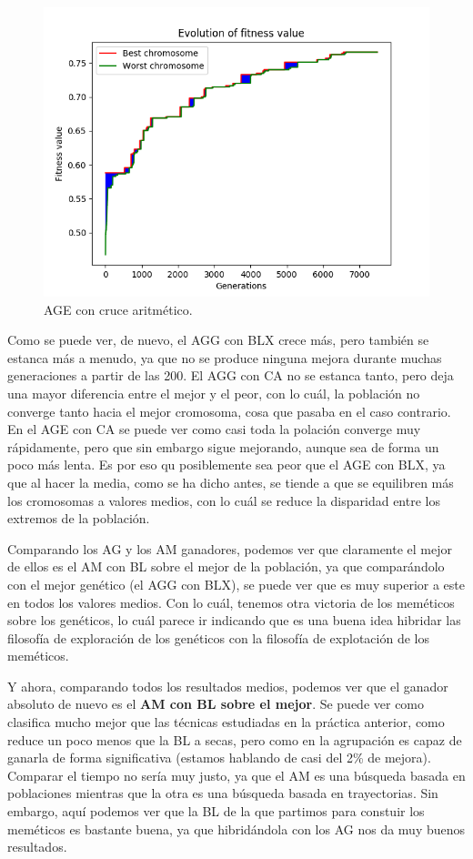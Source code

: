 \documentclass[11pt,a4paper]{article}
\begin{document}
\begin{figure}[H]
\centering
\includegraphics[scale=0.6]{img/age-ac-ionosphere.png}
\caption{AGE con cruce aritmético.}
\end{figure}

Como se puede ver, de nuevo, el AGG con BLX crece más, pero también se estanca más a menudo, ya que no se produce ninguna mejora
durante muchas generaciones a partir de las 200. El AGG con CA no se estanca tanto, pero deja una mayor diferencia entre el
mejor y el peor, con lo cuál, la población no converge tanto hacia el mejor cromosoma, cosa que pasaba en el caso contrario.
En el AGE con CA se puede ver como casi toda la polación converge muy rápidamente, pero que sin embargo sigue mejorando, aunque
sea de forma un poco más lenta. Es por eso qu posiblemente sea peor que el AGE con BLX, ya que al hacer la media, como se ha
dicho antes, se tiende a que se equilibren más los cromosomas a valores medios, con lo cuál se reduce la disparidad entre los
extremos de la población.

Comparando los AG y los AM ganadores, podemos ver que claramente el mejor de ellos es el AM con BL sobre el mejor de la población,
ya que comparándolo con el mejor genético (el AGG con BLX), se puede ver que es muy superior a este en todos los valores medios.
Con lo cuál, tenemos otra victoria de los meméticos sobre los genéticos, lo cuál parece ir indicando que es una buena idea
hibridar las filosofía de exploración de los genéticos con la filosofía de explotación de los meméticos.

Y ahora, comparando todos los resultados medios, podemos ver que el ganador absoluto de nuevo es el \textbf{AM con BL sobre el
mejor}. Se puede ver como clasifica mucho mejor que las técnicas estudiadas en la práctica anterior, como reduce un poco menos
que la BL a secas, pero como en la agrupación es capaz de ganarla de forma significativa (estamos hablando de casi del 2\% de
mejora). Comparar el tiempo no sería muy justo, ya que el AM es una búsqueda basada en poblaciones mientras que la otra es una
búsqueda basada en trayectorias. Sin embargo, aquí podemos ver que la BL de la que partimos para constuir los meméticos
es bastante buena, ya que hibridándola con los AG nos da muy buenos resultados.
\end{document}
